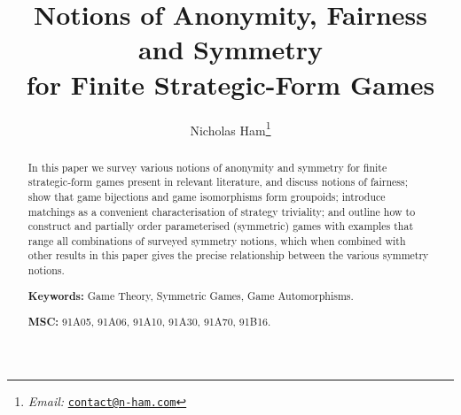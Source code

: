 \documentclass[a4paper, 11pt]{article}
\theoremstyle{paper}
\begin{document}
    \title{Notions of Anonymity, Fairness and Symmetry \\ for Finite Strategic-Form Games}
    \author{Nicholas Ham\footnote{{\it Email:} \href{mailto:contact@n-ham.com}{\tt contact@n-ham.com}}}
	\maketitle


    \begin{abstract}
    		In this paper we survey various notions of anonymity and symmetry for finite strategic-form games present in relevant literature, and discuss notions of fairness; show that game bijections and game isomorphisms form groupoids; introduce matchings as a convenient characterisation of strategy triviality; and outline how to construct and partially order parameterised (symmetric) games with examples that range all combinations of surveyed symmetry notions, which when combined with other results in this paper gives the precise relationship between the various symmetry notions.
    		
    		\textbf{Keywords:} Game Theory, Symmetric Games, Game Automorphisms.
    		
    		\textbf{MSC:} 
    		91A05, %
    		91A06, %
    		91A10, %
    		91A30, %
    		91A70, %
    		91B16. %
    \end{abstract}
    
    \begin{center}
    	\tableofcontents
    \end{center}
    
    
    
    
    
    
    
\end{document}
